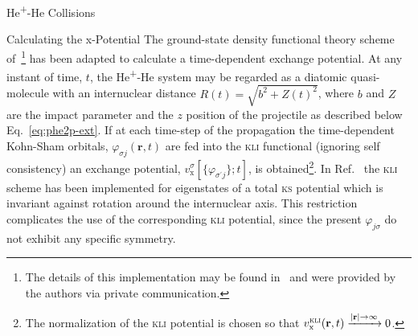 \documentclass[letterpaper, 11 pt]{report}
\begin{document}
\begin{chapter}{\texorpdfstring{He\textsuperscript{+}}{He+}-He Collisions \label{chap:hephe}}
\begin{section}{Calculating the x-Potential \label{sec:pot}}
      The ground-state density functional theory scheme of~\cite{diamol}\footnote{The details of this
      implementation may be found in~\cite{diamol} and were provided by the authors via private
      communication.} has been adapted to calculate a time-dependent exchange potential. At any instant
      of time, $t$, the He\textsuperscript{+}-He system may be regarded as a diatomic quasi-molecule with
      an internuclear distance $R(t) = \sqrt{b^2 + Z(t)^2}$, where $b$ and $Z$ are the impact parameter
      and the $z$ position of the projectile as described below Eq.~\eqref{eq:phe2p-ext}. If at each
      time-step of the propagation the time-dependent Kohn-Sham orbitals,
      $\varphi_{\sigma j}(\mathbf{r},t)$ are fed into the \textsc{kli} functional (ignoring self
      consistency) an exchange potential, $v^{\sigma}_\mathrm{x}[ \{ \varphi_{\sigma^\prime j} \};t]$,
      is obtained\footnote{The normalization of the \textsc{kli} potential is chosen so that
      $v_\mathrm{x}^\textsc{kli}(\mathbf{r},t) \xrightarrow{\vert \mathbf{r} \vert \to \infty} 0$.}. In
      Ref.~\cite{diamol} the \textsc{kli} scheme has been implemented for eigenstates of a total
      \textsc{ks} potential which is invariant against rotation around the internuclear axis. This
      restriction complicates the use of the corresponding \textsc{kli} potential, since the present
      $\varphi_{j \sigma}$ do not exhibit any specific symmetry.


\end{section}
\end{chapter}
\end{document}
